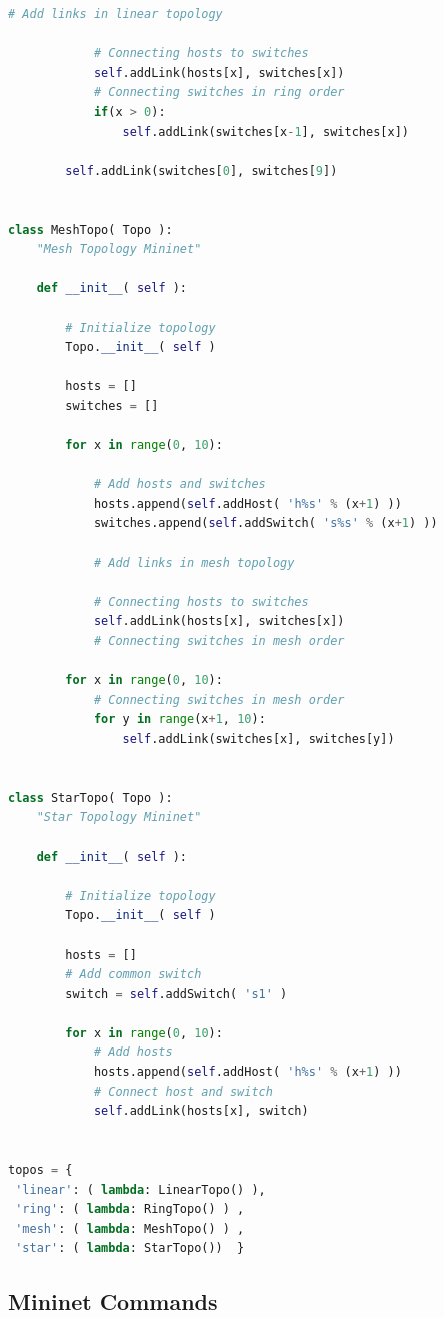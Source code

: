 \documentclass[a4paper, 11pt]{article}
\begin{document}
\begin{appendices}
\begin{lstlisting}[language=python]
            # Add links in linear topology

            # Connecting hosts to switches
            self.addLink(hosts[x], switches[x])
            # Connecting switches in ring order
            if(x > 0):
                self.addLink(switches[x-1], switches[x])

        self.addLink(switches[0], switches[9])


class MeshTopo( Topo ):
    "Mesh Topology Mininet"

    def __init__( self ):

        # Initialize topology
        Topo.__init__( self )

        hosts = []
        switches = []

        for x in range(0, 10):

            # Add hosts and switches
            hosts.append(self.addHost( 'h%s' % (x+1) ))
            switches.append(self.addSwitch( 's%s' % (x+1) ))

            # Add links in mesh topology

            # Connecting hosts to switches
            self.addLink(hosts[x], switches[x])
            # Connecting switches in mesh order

        for x in range(0, 10):
            # Connecting switches in mesh order
            for y in range(x+1, 10):
                self.addLink(switches[x], switches[y])


class StarTopo( Topo ):
    "Star Topology Mininet"

    def __init__( self ):

        # Initialize topology
        Topo.__init__( self )

        hosts = []
        # Add common switch
        switch = self.addSwitch( 's1' )

        for x in range(0, 10):
            # Add hosts
            hosts.append(self.addHost( 'h%s' % (x+1) ))
            # Connect host and switch
            self.addLink(hosts[x], switch)
   

topos = { 
 'linear': ( lambda: LinearTopo() ),
 'ring': ( lambda: RingTopo() ) ,
 'mesh': ( lambda: MeshTopo() ) ,
 'star': ( lambda: StarTopo())  }
\end{lstlisting}

\subsection{Mininet Commands}
\label{appendix:mininet_commands}


\end{appendices}
\end{document}
